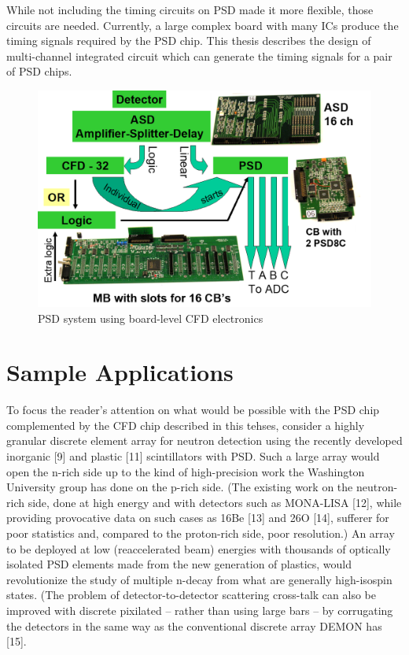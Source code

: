 \documentclass[12pt,oneside,final]{siuethesis}
\theoremstyle{definition}
\begin{document}
While not including the timing circuits on PSD made it more flexible, those circuits are needed.  Currently, a large complex board with many ICs produce the timing signals required by the PSD chip. This thesis describes the design of multi-channel integrated circuit which can generate the timing signals for a pair of PSD chips.

\begin{figure}[htbp!]
	\centering
 	\includegraphics[scale=0.9,keepaspectratio=true]{./ch1_figures/PSD_system.png}
 	\caption{PSD system using board-level CFD electronics}
 	\label{FIG:PSD_SYSTEM}
\end{figure}



\section{Sample Applications}

To focus the reader’s attention on what would be possible with the PSD chip complemented by the CFD chip described in this tehses, consider a highly granular discrete element array for neutron detection using the recently developed inorganic [9] and plastic [11] scintillators with PSD. Such a large array would open the n-rich side up to the kind of high-precision work the Washington University group has done on the p-rich side. (The existing work on the neutron-rich side, done at high energy and with detectors such as MONA-LISA [12], while providing provocative data on such cases as 16Be [13] and 26O [14], sufferer for poor statistics and, compared to the proton-rich side, poor resolution.) An array to be deployed at low (reaccelerated beam) energies with thousands of optically isolated PSD elements made from the new generation of plastics, would revolutionize the study of multiple n-decay from what are generally high-isospin states. (The problem of detector-to-detector scattering cross-talk can also be improved with discrete pixilated – rather than using large bars – by corrugating the detectors in the same way as the conventional discrete array DEMON has [15].  
\end{document}
